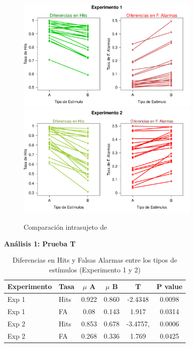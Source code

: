 \begin{figure}[th]
\centering
\includegraphics[width=0.80\textwidth]{Figures/Diff_Rate_E1}\\ 
\includegraphics[width=0.80\textwidth]{Figures/Diff_Rate_E2}
\caption[Diferencias en Tasas (Evaluando diferencias en el desempeño entre las condiciones)]{Comparación intrasujeto de}
\label{fig:Diff_Rate}
\end{figure}


\textbf{Análisis 1: Prueba T}



\begin{table}
\caption[Prueba T para evaluar diferencias en las medias de las tasas de ejecución (Hits y F. Alarmas) entre condiciones]{Diferencias en Hits y Falsas Alarmas entre los tipos de estímulos (Experimento 1 y 2)}
\label{Tabla_t-HitsyFA}
\centering
\begin{tabular}{l l | c c c c}
\toprule
\textbf{Experimento} & \textbf{Tasa} & \textbf{$\mu$ A} & \textbf{$\mu$ B} & \textbf{T} & \textbf{P value}\\
\midrule
Exp 1 & Hits & 0.922 & 0.860 & -2.4348 & 0.0098 \\
Exp 1 & FA & 0.08 & 0.143 & 1.917 & 0.0314 \\
Exp 2 & Hits & 0.853 & 0.678 & -3.4757, & 0.0006 \\
Exp 2 & FA & 0.268 & 0.336 & 1.769 & 0.0425 \\
\bottomrule
\end{tabular}
\end{table}

